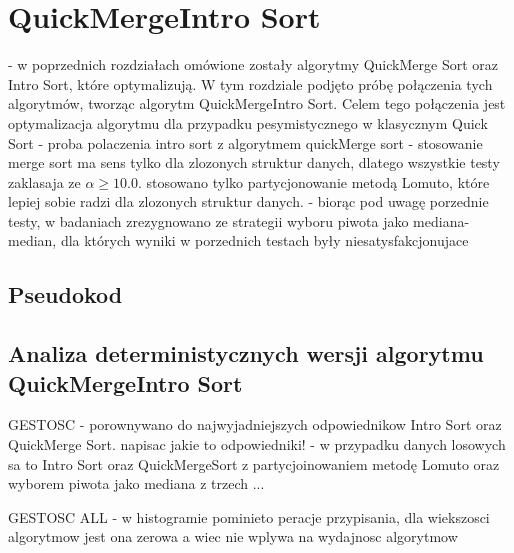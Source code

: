 \newpage
\section{QuickMergeIntro Sort}
- w poprzednich rozdziałach omówione zostały algorytmy QuickMerge Sort oraz Intro Sort, które optymalizują.
W tym rozdziale podjęto próbę połączenia tych algorytmów, tworząc algorytm QuickMergeIntro Sort. Celem tego połączenia jest optymalizacja algorytmu dla przypadku pesymistycznego w klasycznym Quick Sort
- proba polaczenia intro sort z algorytmem quickMerge sort
- stosowanie merge sort ma sens tylko dla zlozonych struktur danych, dlatego wszystkie testy zaklasaja ze $\alpha \geq 10.0$. stosowano tylko partycjonowanie metodą Lomuto, które lepiej sobie radzi dla zlozonych struktur danych.
- biorąc pod uwagę porzednie testy, w badaniach zrezygnowano ze strategii wyboru piwota jako mediana-median, dla których wyniki w porzednich testach były niesatysfakcjonujace

\subsection{Pseudokod}



\subsection{Analiza deterministycznych wersji algorytmu QuickMergeIntro Sort}

GESTOSC
- porownywano do najwyjadniejszych odpowiednikow Intro Sort oraz QuickMerge Sort. napisac jakie to odpowiedniki!
- w przypadku danych losowych sa to Intro Sort oraz QuickMergeSort z partycjoinowaniem metodę Lomuto oraz wyborem piwota jako mediana z trzech ...

GESTOSC ALL
- w histogramie pominieto peracje przypisania, dla wiekszosci algorytmow jest ona zerowa a wiec nie wplywa na wydajnosc algorytmow

\begin{figure}[]
	\centering
	
	\caption[]{}
	\label{fig:quick-merge-intro-sort-deterministic-pivot-random-sorted}
\end{figure}

\begin{figure}[]
	\centering
	
	\caption[]{}
	\label{fig:quick-merge-intro-sort-deterministic-pivot-density}
\end{figure}

